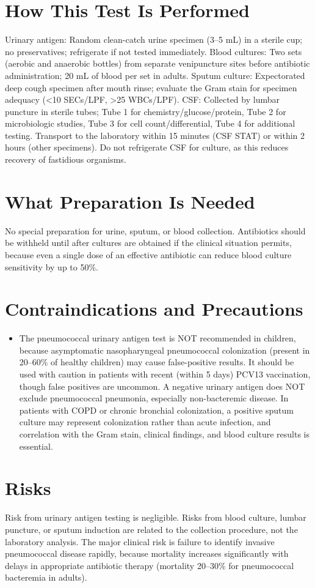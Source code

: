\section*{How This Test Is Performed}
Urinary antigen: Random clean-catch urine specimen (3--5 mL) in a sterile cup; no preservatives; refrigerate if not tested immediately. Blood cultures: Two sets (aerobic and anaerobic bottles) from separate venipuncture sites before antibiotic administration; 20 mL of blood per set in adults. Sputum culture: Expectorated deep cough specimen after mouth rinse; evaluate the Gram stain for specimen adequacy (<10 SECs/LPF, >25 WBCs/LPF). CSF: Collected by lumbar puncture in sterile tubes; Tube 1 for chemistry/glucose/protein, Tube 2 for microbiologic studies, Tube 3 for cell count/differential, Tube 4 for additional testing. Transport to the laboratory within 15 minutes (CSF STAT) or within 2 hours (other specimens). Do not refrigerate CSF for culture, as this reduces recovery of fastidious organisms.

\section*{What Preparation Is Needed}
No special preparation for urine, sputum, or blood collection. Antibiotics should be withheld until after cultures are obtained if the clinical situation permits, because even a single dose of an effective antibiotic can reduce blood culture sensitivity by up to 50\%.

\section*{Contraindications and Precautions}
\begin{itemize}
  \item The pneumococcal urinary antigen test is NOT recommended in children, because asymptomatic nasopharyngeal pneumococcal colonization (present in 20--60\% of healthy children) may cause false-positive results. It should be used with caution in patients with recent (within 5 days) PCV13 vaccination, though false positives are uncommon. A negative urinary antigen does NOT exclude pneumococcal pneumonia, especially non-bacteremic disease. In patients with COPD or chronic bronchial colonization, a positive sputum culture may represent colonization rather than acute infection, and correlation with the Gram stain, clinical findings, and blood culture results is essential.
\end{itemize}
\section*{Risks}
Risk from urinary antigen testing is negligible. Risks from blood culture, lumbar puncture, or sputum induction are related to the collection procedure, not the laboratory analysis. The major clinical risk is failure to identify invasive pneumococcal disease rapidly, because mortality increases significantly with delays in appropriate antibiotic therapy (mortality 20--30\% for pneumococcal bacteremia in adults).

